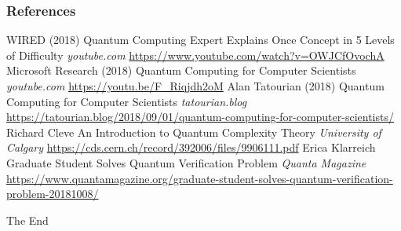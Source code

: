 \documentclass{beamer}
\begin{document}
\begin{frame}
\frametitle{References}
\footnotesize{
\begin{thebibliography}{99} %
 WIRED (2018)
\newblock Quantum Computing Expert Explains Once Concept in 5 Levels of Difficulty
\newblock \emph{youtube.com} \url{https://www.youtube.com/watch?v=OWJCfOvochA}
 Microsoft Research (2018)
\newblock Quantum Computing for Computer Scientists
\newblock \emph{youtube.com} \url{https://youtu.be/F_Riqjdh2oM}
 Alan Tatourian (2018)
\newblock Quantum Computing for Computer Scientists
\newblock \emph{tatourian.blog} \url{https://tatourian.blog/2018/09/01/quantum-computing-for-computer-scientists/}
 Richard Cleve
\newblock An Introduction to Quantum Complexity Theory
\newblock \emph{University of Calgary} \url{https://cds.cern.ch/record/392006/files/9906111.pdf}
 Erica Klarreich
\newblock Graduate Student Solves Quantum Verification Problem
\newblock \emph{Quanta Magazine} \url{https://www.quantamagazine.org/graduate-student-solves-quantum-verification-problem-20181008/}
\end{thebibliography}
}
\end{frame}

\begin{frame}
\Huge{\centerline{The End}}
\end{frame}
\end{document}
